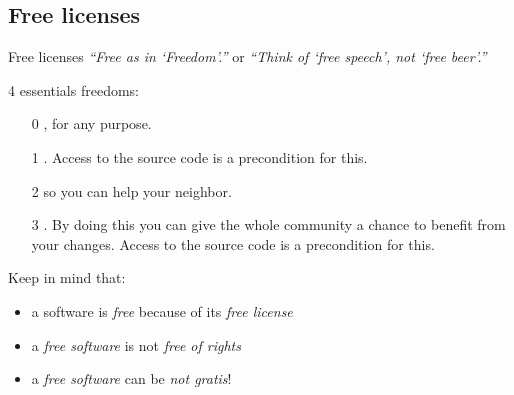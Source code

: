 \documentclass[10pt,xcolor=svgnames]{beamer}
\begin{document}
\subsection{Free licenses}
\begin{frame}{Free licenses}
\emph{``Free as in `Freedom'.''} or \emph{``Think of `free speech', not `free beer'.''}

  \begin{block}{4 essentials freedoms:}
    \begin{itemize}
      \item[0] , for any purpose.
      \item[1] . Access to the source code is a precondition for this.
      \item[2]  so you can help your neighbor.
      \item[3] . By doing this you can give the whole community a chance to benefit from your changes. Access to the source code is a precondition for this.
    \end{itemize}
  \end{block}

  \begin{block}{Keep in mind that:}
    \begin{itemize}
      \item a software is \emph{free} because of its \emph{free license}
      \item a \emph{free software} is not \emph{free of rights}
      \item a \emph{free software} can be \emph{not gratis}!
    \end{itemize}
  \end{block}
\end{frame}
\end{document}
